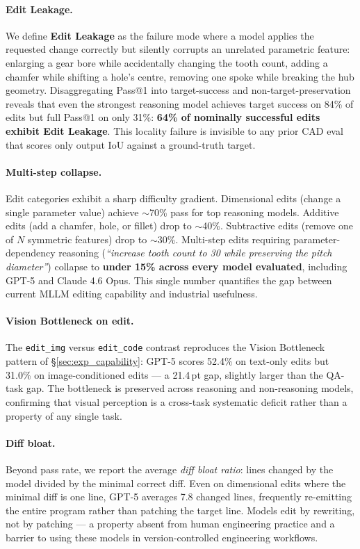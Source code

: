 \documentclass{article}
\begin{document}
\paragraph{Edit Leakage.} We define \textbf{Edit Leakage} as the failure mode where a model applies the requested change correctly but silently corrupts an unrelated parametric feature: enlarging a gear bore while accidentally changing the tooth count, adding a chamfer while shifting a hole's centre, removing one spoke while breaking the hub geometry. Disaggregating Pass@1 into target-success and non-target-preservation reveals that even the strongest reasoning model achieves target success on 84\% of edits but full Pass@1 on only 31\%: \textbf{64\% of nominally successful edits exhibit Edit Leakage}. This locality failure is invisible to any prior CAD eval that scores only output IoU against a ground-truth target.

\paragraph{Multi-step collapse.} Edit categories exhibit a sharp difficulty gradient. Dimensional edits (change a single parameter value) achieve $\sim$70\% pass for top reasoning models. Additive edits (add a chamfer, hole, or fillet) drop to $\sim$40\%. Subtractive edits (remove one of $N$ symmetric features) drop to $\sim$30\%. Multi-step edits requiring parameter-dependency reasoning (\emph{``increase tooth count to 30 while preserving the pitch diameter''}) collapse to \textbf{under 15\% across every model evaluated}, including GPT-5 and Claude 4.6 Opus. This single number quantifies the gap between current MLLM editing capability and industrial usefulness.

\paragraph{Vision Bottleneck on edit.} The \texttt{edit\_img} versus \texttt{edit\_code} contrast reproduces the Vision Bottleneck pattern of \S\ref{sec:exp_capability}: GPT-5 scores 52.4\% on text-only edits but 31.0\% on image-conditioned edits --- a 21.4\,pt gap, slightly larger than the QA-task gap. The bottleneck is preserved across reasoning and non-reasoning models, confirming that visual perception is a cross-task systematic deficit rather than a property of any single task.

\paragraph{Diff bloat.} Beyond pass rate, we report the average \emph{diff bloat ratio}: lines changed by the model divided by the minimal correct diff. Even on dimensional edits where the minimal diff is one line, GPT-5 averages 7.8 changed lines, frequently re-emitting the entire program rather than patching the target line. Models edit by rewriting, not by patching --- a property absent from human engineering practice and a barrier to using these models in version-controlled engineering workflows.
\end{document}
